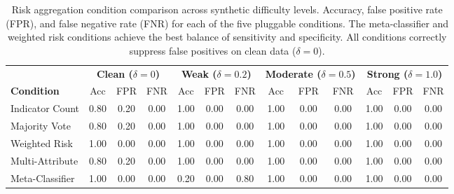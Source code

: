 \begin{table}[ht]
\centering
\scriptsize
\caption{Risk aggregation condition comparison across synthetic difficulty levels. Accuracy, false positive rate (FPR), and false negative rate (FNR) for each of the five pluggable conditions. The meta-classifier and weighted risk conditions achieve the best balance of sensitivity and specificity. All conditions correctly suppress false positives on clean data ($\delta{=}0$).}
\label{tab:risk_conditions}
\begin{tabular}{l|ccc|ccc|ccc|ccc}
\hline
 & \multicolumn{3}{c|}{\textbf{Clean ($\delta{=}0$)}} & \multicolumn{3}{c|}{\textbf{Weak ($\delta{=}0.2$)}} & \multicolumn{3}{c|}{\textbf{Moderate ($\delta{=}0.5$)}} & \multicolumn{3}{c}{\textbf{Strong ($\delta{=}1.0$)}} \\
\textbf{Condition} & Acc & FPR & FNR & Acc & FPR & FNR & Acc & FPR & FNR & Acc & FPR & FNR \\
\hline
Indicator Count & 0.80 & 0.20 & 0.00 & 1.00 & 0.00 & 0.00 & 1.00 & 0.00 & 0.00 & 1.00 & 0.00 & 0.00 \\
Majority Vote & 0.80 & 0.20 & 0.00 & 1.00 & 0.00 & 0.00 & 1.00 & 0.00 & 0.00 & 1.00 & 0.00 & 0.00 \\
Weighted Risk & 1.00 & 0.00 & 0.00 & 1.00 & 0.00 & 0.00 & 1.00 & 0.00 & 0.00 & 1.00 & 0.00 & 0.00 \\
Multi-Attribute & 0.80 & 0.20 & 0.00 & 1.00 & 0.00 & 0.00 & 1.00 & 0.00 & 0.00 & 1.00 & 0.00 & 0.00 \\
Meta-Classifier & 1.00 & 0.00 & 0.00 & 0.20 & 0.00 & 0.80 & 1.00 & 0.00 & 0.00 & 1.00 & 0.00 & 0.00 \\
\hline
\end{tabular}
\end{table}